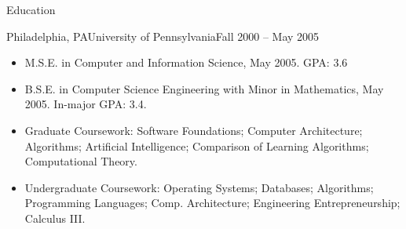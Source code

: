 
\begin{cvsection}{Education}
	\begin{cvsubsection}{Philadelphia, PA}{University of Pennsylvania}{Fall 2000 -- May 2005}
		\begin{itemize}
			\item M.S.E. in Computer and Information Science, May 2005. GPA: 3.6
			\item B.S.E. in Computer Science Engineering with Minor in Mathematics, May 2005.  In-major GPA: 3.4.
			\item Graduate Coursework: Software Foundations; Computer Architecture; Algorithms; Artificial Intelligence; Comparison of Learning Algorithms; Computational Theory.
			\item Undergraduate Coursework: Operating Systems; Databases; Algorithms; Programming Languages; Comp. Architecture; Engineering Entrepreneurship; Calculus III.
		\end{itemize}
	\end{cvsubsection}
\end{cvsection}
